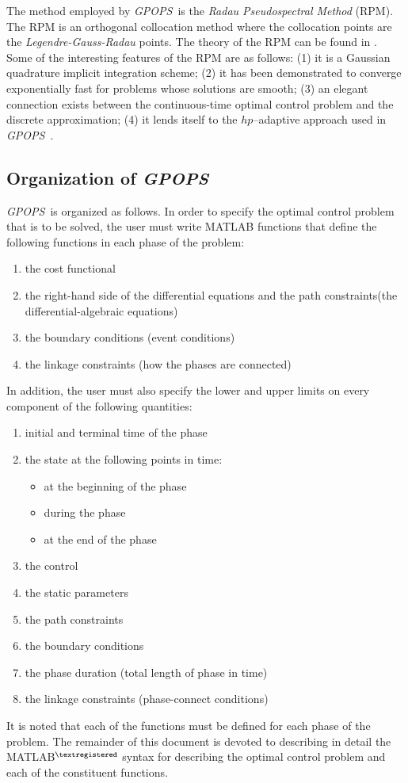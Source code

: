 \documentclass[10pt]{article}
\newcommand{\gpops}{{\em GPOPS}~}
\begin{document}
The method employed by \gpops is the {\em Radau Pseudospectral
Method} (RPM).  The RPM is an orthogonal collocation method where
the collocation points are the {\em Legendre-Gauss-Radau} points.  The
theory of the RPM can be found in
\cite{Garg1,Garg2,Garg3,Garg4,Patterson1}.  Some of the interesting
features of the RPM are as follows:  (1) it is a Gaussian quadrature
implicit integration scheme; (2) it has been demonstrated to converge
exponentially fast for problems whose solutions are smooth; (3) an
elegant connection exists between the continuous-time optimal control
problem and the discrete approximation; (4) it lends itself to the
$hp$--adaptive approach used in \gpops.  

\subsection{Organization of \gpops}

\gpops is organized as follows.  In order to specify the optimal control
problem that is to be solved, the user must write MATLAB functions that
define the following functions in each phase of the problem:
\begin{enumerate}[(1)]
  \item the cost functional
  \item the right-hand side of the differential equations and the path constraints(\ie the differential-algebraic equations)
  \item the boundary conditions (\ie event conditions)
  \item the linkage constraints (\ie how the phases are connected)
\end{enumerate}
In addition, the user must also specify the lower and upper limits on every component of the following quantities:
\begin{enumerate}[(1)]
  \item initial and terminal time of the phase
  \item the state at the following points in time:
    \begin{itemize}
    \item at the beginning of the phase
    \item during the phase
    \item at the end of the phase
    \end{itemize}
  \item the control
  \item the static parameters
  \item the path constraints
  \item the boundary conditions
  \item the phase duration (\ie total length of phase in time)
  \item the linkage constraints (\ie phase-connect conditions)
\end{enumerate}
It is noted that each of the functions must be defined for each phase
of the problem. The remainder of this document is devoted to describing in detail the
MATLAB${}^{\textregistered}$ syntax for describing the optimal control problem and each of the constituent functions.
\end{document}
